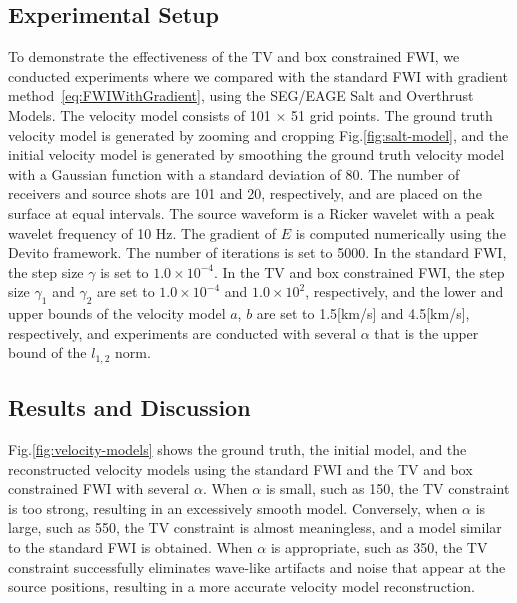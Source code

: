 \subsection{Experimental Setup}\label{subsec:experimental-setup}

To demonstrate the effectiveness of the TV and box constrained FWI, we conducted experiments where we compared with the standard FWI with gradient method~\eqref{eq:FWIWithGradient}, using the SEG/EAGE Salt and Overthrust Models.
The velocity model consists of 101 $\times$ 51 grid points.
The ground truth velocity model is generated by zooming and cropping Fig.\ref{fig:salt-model}, and the initial velocity model is generated by smoothing the ground truth velocity model with a Gaussian function with a standard deviation of 80.
The number of receivers and source shots are 101 and 20, respectively, and are placed on the surface at equal intervals.
The source waveform is a Ricker wavelet with a peak wavelet frequency of 10 Hz.
The gradient of $E$ is computed numerically using the Devito framework\cite{devito}.
The number of iterations is set to 5000.
In the standard FWI, the step size $\gamma$ is set to $1.0 \times 10^{-4}$.
In the TV and box constrained FWI, the step size $\gamma_1$ and $\gamma_2$ are set to $1.0 \times 10^{-4}$ and $1.0 \times 10^2$, respectively,
    and the lower and upper bounds of the velocity model $a$, $b$ are set to 1.5[km/s] and 4.5[km/s], respectively,
    and experiments are conducted with several $\alpha$ that is the upper bound of the $l_{1,2}$ norm.


\subsection{Results and Discussion}\label{subsec:results-and-discussion}

Fig.\ref{fig:velocity-models} shows the ground truth, the initial model, and the reconstructed velocity models using the standard FWI and the TV and box constrained FWI with several $\alpha$.
When $\alpha$ is small, such as 150, the TV constraint is too strong, resulting in an excessively smooth model.
Conversely, when $\alpha$ is large, such as 550, the TV constraint is almost meaningless, and a model similar to the standard FWI is obtained.
When $\alpha$ is appropriate, such as 350, the TV constraint successfully eliminates wave-like artifacts and noise that appear at the source positions, resulting in a more accurate velocity model reconstruction.

